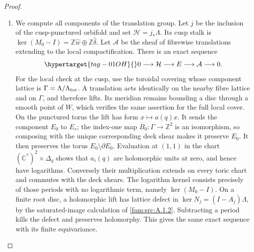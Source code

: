 \begin{proof}
\begin{enumerate}[label=\arabic*.,leftmargin=*]
\item We compute all components of the translation group.  Let $j$ be the
inclusion of the cusp-punctured orbifold and set
$\mathcal H=j_*\Lambda$.  Its cusp stalk is
$\ker(M_0-I)=\mathbb Z\widehat w\oplus\mathbb Z\widehat\delta$.
Let $\mathcal A$ be the sheaf of fibrewise translations extending to
the local compactification.  There is an exact sequence
\begin{equation}\hypertarget{tag-01OH}{}\label{eq:P5exponential}
0\longrightarrow\mathcal H\longrightarrow E\longrightarrow\mathcal A
\longrightarrow0.
\end{equation}
For the local check at the cusp, use the toroidal covering whose
component lattice is $\Gamma=\Lambda/\Lambda_{\rm tor}$.  A translation
acts identically on the nearby fibre lattice and on $\Gamma$, and
therefore lifts.  Its meridian remains bounding a disc through a smooth
point of $W$, which verifies the same assertion for the full local
cover.  On the punctured torus the lift has form $x\mapsto a(q)x$.
It sends the component $E_0$ to $E_v$; the index-one map
$B_0:\Gamma\to\mathbb Z^2$ is an isomorphism, so composing with the
unique corresponding deck shear makes it preserve $E_0$.  It then
preserves the torus $E_0\setminus\partial E_0$.  Evaluation at $(1,1)$
in the chart $(\mathbb C^*)^2\times\Delta_q$ shows that $a_i(q)$ are
holomorphic units at zero, and hence have logarithms.  Conversely their
multiplication extends on every toric chart and commutes with the deck
shears.  The logarithm kernel consists precisely of those periods with
no logarithmic term, namely $\ker(M_0-I)$.  On a finite root disc, a holomorphic lift has lattice defect in
$\ker N_j=(I-A_j)\Lambda$, by the saturated-image calculation
of \cref{fam:src:A.1.2}. Subtracting a period kills the defect
and preserves holomorphy. This gives the same exact sequence
with its finite equivariance.


\end{enumerate}
\end{proof}
